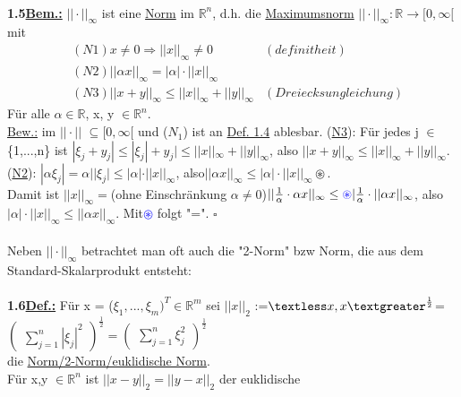 \documentclass[11pt]{article}
\begin{document}
	\\
	\textbf{1.5\underline{Bem.:}} $||\cdot||_\infty$ ist eine 
	\ul{Norm} im $\mathbb{R}^n$, d.h. die \ul{Maximumsnorm} 
	$||\cdot||_\infty:\mathbb{R}\rightarrow[0,\infty[$\\
	mit\begin{align}
		&(N1) x \neq0\Rightarrow||x||_\infty\neq0 &(definitheit)\nonumber\\
		&(N2) ||\alpha x||_\infty= |\alpha|\cdot||x||_\infty\nonumber\\
		&(N3) ||x+y||_\infty \leq || x ||_\infty + ||y||_\infty & (Dreiecksungleichung)\nonumber
	\end{align} 
	Für alle $\alpha \in \mathbb{R}$, x, y $\in \mathbb{R}^n$.\\
	\underline{Bew.:}  im $||\cdot||$ $\subseteq [0,\infty[$ und 
	(\ul{$N_1$}) ist an  \ul{Def. 1.4} 
	ablesbar.  (\ul{N3}): Für jedes j $\in$ \{1,...,n\} ist 
	$|\xi_j + y_j| \leq|\xi_j|+y_j|\leq ||x||_\infty +||y||_\infty$, also 
	$||x+y||_\infty \leq ||x||_\infty + ||y||_\infty.$\\
	(\ul{N2}): $| \alpha \xi_j| = \alpha| |\xi_j| \leq |\alpha|\cdot 
	||x||_\infty$, also$||\alpha x ||_\infty \leq |\alpha|\cdot||x||_\infty 
	\circledast$.\\
	Damit ist $||x||_\infty = $(ohne Einschränkung $\alpha \neq 0$)$|| 
	\frac{1}{\alpha}\cdot \alpha x||_\infty \leq\textcolor{blue}{\circledast} 
	|\frac{1}{\alpha} 
	\cdot||\alpha x ||_\infty$, also $|\alpha| \cdot ||x||_\infty \leq ||\alpha 
	x||_\infty$. Mit\textcolor{blue}{$\circledast$} folgt "=". $\square$ \\
	\\
	Neben $||\cdot||_\infty$ betrachtet man oft auch die "2-Norm" bzw Norm, die 
	aus dem Standard-Skalarprodukt entsteht:\\
	\\
	\textbf{1.6\underline{Def.:}} Für x = ($\xi_1,...,\xi_m)^T\in\mathbb{R}^m$ 
	sei 
	$||x||_2$ :=$\textless x,x \textgreater^{\frac{1}{2}}$=
	$\begin{pmatrix} 
		\sum_{j=1}^{n}|\xi_j|^2
	\end{pmatrix}^{\frac{1}{2}}
	=
	\begin{pmatrix} 
		\sum_{j=1}^{n}\xi_j^2
	\end{pmatrix}^{\frac{1}{2}}$
	\\
	die  \ul{Norm/2-Norm/euklidische Norm}.\\
	Für x,y $\in \mathbb{R}^n$ ist $||x-y||_2 = ||y-x||_2$ der euklidische 
\end{document}
